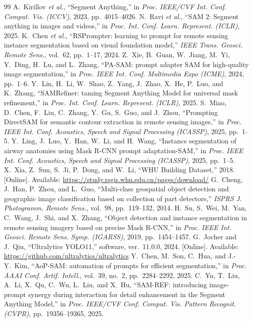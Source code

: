 \documentclass{article}
\begin{document}
\begin{thebibliography}{99}
 A.~Kirillov \textit{et al.}, ``Segment Anything,'' in \textit{Proc. IEEE/CVF Int. Conf. Comput. Vis. (ICCV)}, 2023, pp.~4015--4026.
 N.~Ravi \textit{et al.}, ``SAM 2: Segment anything in images and videos,'' in \textit{Proc. Int. Conf. Learn. Represent. (ICLR)}, 2025.
 K.~Chen \textit{et al.}, ``RSPrompter: learning to prompt for remote sensing instance segmentation based on visual foundation model,'' \textit{IEEE Trans. Geosci. Remote Sens.}, vol.~62, pp.~1--17, 2024.
 Z.~Xie, B.~Guan, W.~Jiang, M.~Yi, Y.~Ding, H.~Lu, and L.~Zhang, ``PA-SAM: prompt adapter SAM for high-quality image segmentation,'' in \textit{Proc. IEEE Int. Conf. Multimedia Expo (ICME)}, 2024, pp.~1--6.
 Y.~Lin, H.~Li, W.~Shao, Z.~Yang, J.~Zhao, X.~He, P.~Luo, and K.~Zhang, ``SAMRefiner: taming Segment Anything Model for universal mask refinement,'' in \textit{Proc. Int. Conf. Learn. Represent. (ICLR)}, 2025.
 S.~Miao, D.~Chen, F.~Liu, C.~Zhang, Y.~Gu, S.~Guo, and J.~Zhou, ``Prompting DirectSAM for semantic contour extraction in remote sensing images,'' in \textit{Proc. IEEE Int. Conf. Acoustics, Speech and Signal Processing (ICASSP)}, 2025, pp.~1--5.
 Y.~Ling, J.~Luo, Y.~Han, W.~Li, and H.~Wang, ``Instance segmentation of airway anatomies using Mask R-CNN prompt adaptation-SAM,'' in \textit{Proc. IEEE Int. Conf. Acoustics, Speech and Signal Processing (ICASSP)}, 2025, pp.~1--5.
 X.~Xia, Z.~Sun, S.~Ji, P.~Dong, and W.~Li, ``WHU Building Dataset,'' 2018. [Online]. Available: \url{https://study.rsgis.whu.edu.cn/pages/download/}
 G.~Cheng, J.~Han, P.~Zhou, and L.~Guo, ``Multi-class geospatial object detection and geographic image classification based on collection of part detectors,'' \textit{ISPRS J. Photogramm. Remote Sens.}, vol.~98, pp.~119--132, 2014.
 H.~Su, S.~Wei, M.~Yan, C.~Wang, J.~Shi, and X.~Zhang, ``Object detection and instance segmentation in remote sensing imagery based on precise Mask R-CNN,'' in \textit{Proc. IEEE Int. Geosci. Remote Sens. Symp. (IGARSS)}, 2019, pp.~1454--1457.
 G.~Jocher and J.~Qiu, ``Ultralytics YOLO11,'' software, ver.~11.0.0, 2024. [Online]. Available: \url{https://github.com/ultralytics/ultralytics}
 Y.~Chen, M.~Son, C.~Hua, and J.-Y.~Kim, ``AoP-SAM: automation of prompts for efficient segmentation,'' in \textit{Proc. AAAI Conf. Artif. Intell.}, vol.~39, no.~2, pp.~2284--2292, 2025.
 C.~Yu, T.~Liu, A.~Li, X.~Qu, C.~Wu, L.~Liu, and X.~Hu, ``SAM-REF: introducing image-prompt synergy during interaction for detail enhancement in the Segment Anything Model,'' in \textit{Proc. IEEE/CVF Conf. Comput. Vis. Pattern Recognit. (CVPR)}, pp.~19356--19365, 2025.
\end{thebibliography}
\end{document}
